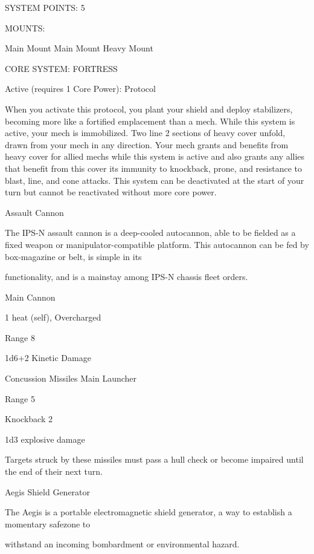                                                SYSTEM POINTS: 5

                                                    MOUNTS:

  Main Mount                         Main Mount                              Heavy Mount

                                          CORE SYSTEM: FORTRESS

  Active (requires 1 Core Power):
  Protocol

  When you activate this protocol, you plant your shield and deploy stabilizers, becoming more like a
  fortified emplacement than a mech. While this system is active, your mech is immobilized. Two line 2
  sections of heavy cover unfold, drawn from your mech in any direction. Your mech grants and benefits
  from heavy cover for allied mechs while this system is active and also grants any allies that benefit from
  this cover its immunity to knockback, prone, and resistance to blast, line, and cone attacks. This
  system can be deactivated at the start of your turn but cannot be reactivated without more core power.

Assault Cannon

The IPS-N assault cannon is a deep-cooled autocannon, able to be fielded as a fixed weapon or
manipulator-compatible platform. This autocannon can be fed by box-magazine or belt, is simple in its

functionality, and is a mainstay among IPS-N chassis fleet orders.

Main Cannon

1 heat (self), Overcharged

Range 8

1d6+2 Kinetic Damage





Concussion Missiles
Main Launcher

Range 5

Knockback 2

1d3 explosive damage

Targets struck by these missiles must pass a hull check or become impaired until the end of their
next turn.


Aegis Shield Generator

The Aegis is a portable electromagnetic shield generator, a way to establish a momentary safezone to

withstand an incoming bombardment or environmental hazard.

